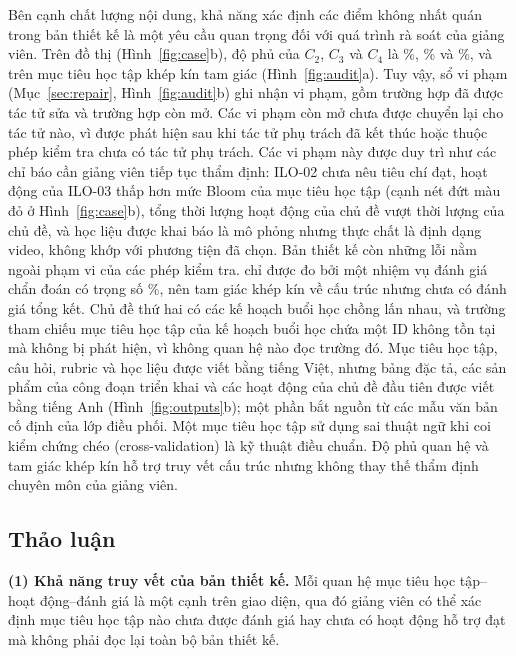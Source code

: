 \documentclass[conference,a4paper]{IEEEtran}
\begin{document}
Bên cạnh chất lượng nội dung, khả năng xác định các điểm không nhất quán trong bản thiết kế là một yêu cầu
quan trọng đối với quá trình rà soát của giảng viên. Trên đồ thị
(Hình~\ref{fig:case}b), độ phủ của $C_2$, $C_3$ và $C_4$ là \caseCovTwo\%, \caseCovThree\% và
\caseCovFour\%, và \caseClosed{} trên \caseObj{} mục tiêu học tập khép kín tam giác
(Hình~\ref{fig:audit}a). Tuy vậy, sổ vi phạm (Mục~\ref{sec:repair}, Hình~\ref{fig:audit}b) ghi
nhận \caseViol{} vi phạm, gồm \caseViolAgent{} trường hợp đã được tác tử sửa và \caseViolOpen{} trường hợp còn mở. Các vi
phạm còn mở chưa được chuyển lại cho tác tử nào, vì được phát hiện
sau khi tác tử phụ trách đã kết thúc hoặc thuộc phép kiểm tra chưa có tác tử phụ trách. Các vi phạm này
được duy trì như các chỉ báo cần giảng viên tiếp tục thẩm định: ILO-02 chưa nêu tiêu chí đạt, hoạt động của ILO-03 thấp hơn
mức Bloom của mục tiêu học tập (cạnh nét đứt màu đỏ ở Hình~\ref{fig:case}b), tổng thời lượng hoạt động của
\caseOverrunMods{} chủ đề vượt thời lượng của chủ đề, và \caseMediaMismatch{} học liệu được khai báo là mô
phỏng nhưng thực chất là định dạng video, không khớp với phương tiện đã chọn. Bản thiết kế còn những lỗi nằm ngoài
phạm vi của các phép kiểm tra. \caseDiagOnlyIds{} chỉ được đo bởi một nhiệm vụ đánh giá chẩn đoán có trọng
số \caseDiagWeight\%, nên tam giác khép kín về cấu trúc nhưng chưa có đánh giá tổng kết. Chủ đề
thứ hai có các kế hoạch buổi học chồng lấn nhau, và trường tham chiếu mục tiêu học tập của kế hoạch buổi học chứa
một ID không tồn tại mà không bị phát hiện, vì không quan hệ nào đọc trường đó. Mục tiêu học tập, câu hỏi, rubric và học liệu được viết bằng
tiếng Việt, nhưng bảng đặc tả, các sản phẩm của công đoạn triển khai và các hoạt động của chủ đề
đầu tiên được viết bằng tiếng Anh (Hình~\ref{fig:outputs}b); một phần bắt nguồn từ các mẫu văn bản cố
định của lớp điều phối. Một mục tiêu học tập sử dụng sai thuật ngữ khi coi kiểm chứng chéo
(cross-validation) là kỹ thuật điều chuẩn. Độ phủ quan hệ và tam giác
khép kín hỗ trợ truy vết cấu trúc nhưng không thay thế thẩm định chuyên môn của giảng viên.

\subsection{Thảo luận}
\label{sec:discussion}

\textbf{(1) Khả năng truy vết của bản thiết kế.} Mỗi quan hệ mục tiêu học tập--hoạt động--đánh giá là một cạnh trên
giao diện, qua đó giảng viên có thể xác định mục tiêu học tập nào chưa được đánh giá hay chưa có hoạt động hỗ trợ đạt mà
không phải đọc lại toàn bộ bản thiết kế.
\end{document}
